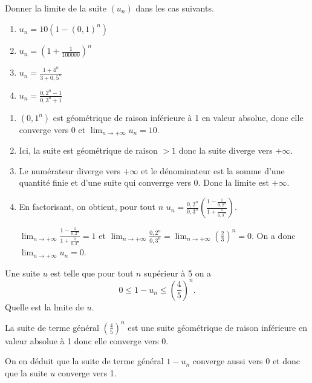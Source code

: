 \documentclass[12pt,a4paper,french]{article}
\begin{document}
\begin{question}
  Donner la limite de la suite $(u_n)$ dans les cas suivants.
  \begin{enumerate}
    \item $u_n = 10(1- (0,1)^n)$
    \item $u_n = \left( 1 + \frac1{100000}\right)^n$
    \item $u_n = \frac{1+ 4^n}{3 + 0,5^n}$
    \item $u_n = \frac{0,2^n - 1}{0,3^n + 1}$
  \end{enumerate}
\end{question}
\begin{solution}
  \begin{enumerate}
    \item $(0,1^n)$ est géométrique de raison inférieure à 1 en valeur
      absolue, donc elle converge vers 0 et $\lim_{n \to +\infty} u_n = 10$.
    \item Ici, la suite est géométrique de raison $>1$ donc la suite diverge
      vers $+\infty$.
    \item Le numérateur diverge vers $+\infty$ et le dénominateur est la
      somme d'une quantité finie et d'une suite qui converrge vers 0. Donc
      la limite est $+\infty$.
    \item En factorisant, on obtient, pour tout $n$ $u_n =
      \frac{0,2^n}{0,3^n}\left(\frac{ 1 - \frac{1}{0,2^n}}{1 +
      \frac{1}{0,3^n}} \right)$.

      $\lim_{n \to +\infty} \frac{ 1 - \frac{1}{0,2^n}}{1 + \frac{1}{0,3^n}}
      = 1$ et $\lim_{n \to +\infty} \frac{0,2^n}{0,3^n} = \lim_{n \to
      +\infty} \left(\frac23\right)^n = 0$. On a donc $\lim_{n \to +\infty}
      u_n = 0$.
  \end{enumerate}
\end{solution}

\begin{question}
  Une suite $u$ est telle que pour tout $n$ supérieur à 5 on a \[ 0
  \leqslant 1 - u_n \leqslant \left(\frac45\right)^n . \] Quelle est la
  lmite de $u$.
\end{question}
\begin{solution}
  La suite de terme général $\left(\frac45\right)^n$ est une suite
  géométrique de raison inférieure en valeur absolue à 1 donc elle converge
  vers 0.

  On en déduit que la suite de terme général $1 - u_n$ converge aussi vers 0
  et donc que la suite $u$ converge vers 1.
\end{solution}
\end{document}
